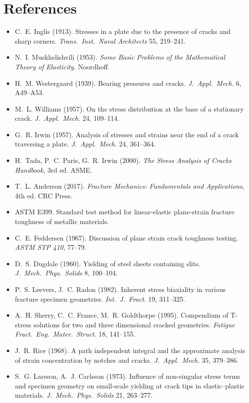 \documentclass[11pt,a4paper]{article}
\begin{document}
\section*{References}
\begin{itemize}
  \item C.~E. Inglis (1913). Stresses in a plate due to the presence of cracks and sharp corners.
  \emph{Trans.\ Inst.\ Naval Architects} 55, 219--241.
  \item N.~I. Muskhelishvili (1953). \emph{Some Basic Problems of the Mathematical Theory of Elasticity}. Noordhoff.
  \item H.~M. Westergaard (1939). Bearing pressures and cracks. \emph{J.\ Appl.\ Mech.} 6, A49--A53.
  \item M.~L. Williams (1957). On the stress distribution at the base of a stationary crack.
  \emph{J.\ Appl.\ Mech.} 24, 109--114.
  \item G.~R. Irwin (1957). Analysis of stresses and strains near the end of a crack traversing a plate.
  \emph{J.\ Appl.\ Mech.} 24, 361--364.
  \item H.~Tada, P.~C. Paris, G.~R. Irwin (2000). \emph{The Stress Analysis of Cracks Handbook}, 3rd ed. ASME.
  \item T.~L. Anderson (2017). \emph{Fracture Mechanics: Fundamentals and Applications}, 4th ed. CRC Press.
  \item ASTM E399. Standard test method for linear-elastic plane-strain fracture toughness of metallic materials.
  \item C.~E. Feddersen (1967). Discussion of plane strain crack toughness testing. \emph{ASTM STP 410}, 77--79.
  \item D.~S. Dugdale (1960). Yielding of steel sheets containing slits. \emph{J.\ Mech.\ Phys.\ Solids} 8, 100--104.
  \item P.~S. Leevers, J.~C. Radon (1982). Inherent stress biaxiality in various fracture specimen geometries. \emph{Int.\ J.\ Fract.} 19, 311--325.
  \item A.~H. Sherry, C.~C. France, M.~R. Goldthorpe (1995). Compendium of T-stress solutions for two and three dimensional cracked geometries. \emph{Fatigue Fract.\ Eng.\ Mater.\ Struct.} 18, 141--155.
  \item J.~R. Rice (1968). A path independent integral and the approximate analysis of strain concentration by notches and cracks. \emph{J.\ Appl.\ Mech.} 35, 379--386.
  \item S.~G. Larsson, A.~J. Carlsson (1973). Influence of non-singular stress terms and specimen geometry on small-scale yielding at crack tips in elastic--plastic materials. \emph{J.\ Mech.\ Phys.\ Solids} 21, 263--277.

\end{itemize}
\end{document}
